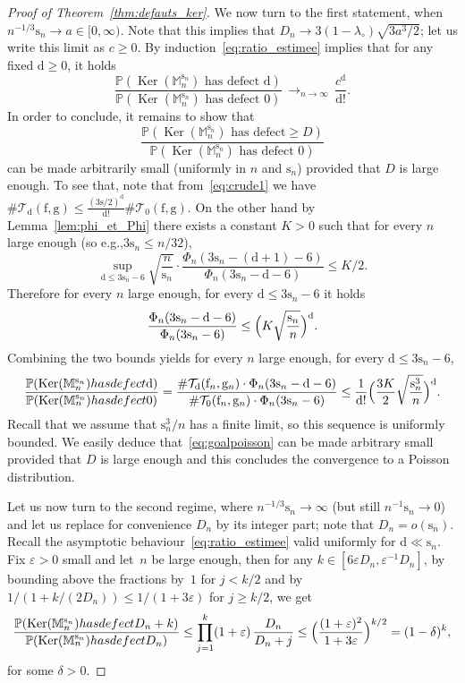 \documentclass[11pt]{article}
\newcommand{\eg}{e.g.,\xspace}
\theoremstyle{plain}
\theoremstyle{definition}
\theoremstyle{remark}
\renewcommand{\P}{\mathbb{P}}
\newcommand{\Mapb}{\mathbb{M}}
\newcommand{\face}{\mathrm{f}}
\newcommand{\defect}{\mathrm{d}}
\newcommand{\gen}{\mathrm{g}}
\newcommand{\spar}{\mathrm{s}}
\DeclareMathOperator{\Ker}{Ker}
\newcommand{\cv}[1][n]{\,\mathop{\longrightarrow}^{}_{#1 \to \infty}\,}
\begin{document}
\begin{proof}[Proof of Theorem~\ref{thm:defauts_ker}]
We now turn to the first statement, when $n^{-1/3} \spar_n \to a \in [0,\infty)$. Note that this implies that $D_n \to 3 (1-\lambda_{\circ}) \sqrt{3 a^3 / 2}$; let us write this limit as $c \ge 0$.
By induction~\eqref{eq:ratio_estimee} implies that for any fixed $\defect\ge0$, it holds
\[
\frac{\P(\Ker(\Mapb_n^{\spar_n}) \textrm{ has defect } \defect)}{\P(\Ker(\Mapb_n^{\spar_n}) \textrm{ has defect } 0)}
\cv \frac{c^\defect}{\defect!}.
\]
In order to conclude, it remains to show that
\begin{equation}\label{eq:goalpoisson}
\frac{\P(\Ker(\Mapb_n^{\spar_n}) \textrm{ has defect} \geq D)}{\P(\Ker(\Mapb_n^{\spar_n}) \textrm{ has defect } 0)}
\end{equation}
can be made arbitrarily small (uniformly in $n$ and $\mathrm{s}_{n}$) provided that $D$ is large enough. To see that, note that from~\eqref{eq:crude1} we have $\# \mathcal{T}_{\defect}(\face,\gen) \le \frac{(3\spar/2)^\defect}{\defect!} \# \mathcal{T}_{0}(\face,\gen)$.
On the other hand by Lemma~\ref{lem:phi_et_Phi} there exists a constant $K>0$ such that for every $n$ large enough (so \eg $3\spar_n \le n/32$),
\[
\sup_{\defect \le 3\spar_n-6} \sqrt{\frac{n}{\spar_n}} \cdot \frac{\Phi_{n}(3\spar_n-(\defect+1)-6 )}{\Phi_{n}(3\spar_n-\defect-6 )}
\le K/2.
\]
Therefore for every $n$ large enough, for every $\defect \le 3\spar_n-6$ it holds
\[
\frac{\Phi_{n}(3\spar_n-\defect-6 )}{\Phi_{n}(3\spar_n-6 )} \le \Bigl(K \sqrt{\frac{\spar_n}{n}}\Bigr)^\defect.
\]
Combining the two bounds yields for every $n$ large enough, for every $\defect \le 3\spar_n-6$,
\[
\frac{\P(\Ker(\Mapb_n^{\spar_n}) \textrm{ has defect } \defect)}{\P(\Ker(\Mapb_n^{\spar_n}) \textrm{ has defect } 0)}
= \frac{\#\mathcal{T}_\defect(\face_n,\gen_n) \cdot \Phi_{n}(3\spar_n-\defect-6)}{\# \mathcal{T}_0(\face_n,\gen_n) \cdot \Phi_{n}(3\spar_n-6 )}
\le \frac{1}{\defect!} \Bigl(\frac{3K}{2} \sqrt{\frac{\spar_n^3}{n}}\Bigr)^\defect.
\]
Recall that we assume that $\spar_n^3/n$ has a finite limit, so this sequence is uniformly bounded. We easily deduce that~\eqref{eq:goalpoisson} can be made arbitrary small provided that $D$ is large enough and this concludes the convergence to a Poisson distribution.

Let us now turn to the second regime, where $n^{-1/3} \spar_n \to \infty$ (but still $n^{-1} \spar_n \to 0$) and let us replace for convenience $D_n$ by its integer part; note that $D_n = o(\spar_n)$.
Recall the asymptotic behaviour~\eqref{eq:ratio_estimee} valid uniformly for $\defect \ll \spar_n$.
Fix $\varepsilon > 0$ small and let~$n$ be large enough, then for any $k \in [6\varepsilon D_n, \varepsilon^{-1} D_n]$, by bounding above the fractions by~$1$ for $j<k/2$ and by $1/(1+k/(2D_n)) \le 1/(1+3\varepsilon)$ for $j \ge k/2$, we get
\[
\frac{\P(\Ker(\Mapb_n^{\spar_n}) \textrm{ has defect } D_n+k)}{\P(\Ker(\Mapb_n^{\spar_n}) \textrm{ has defect } D_n)}
\le \prod_{j=1}^k (1+\varepsilon)\, \frac{D_n}{D_n+j}
\le \Bigl(\frac{(1+\varepsilon)^2}{1+3\varepsilon}\Bigr)^{k/2}
= (1-\delta)^{k},
\]
for some $\delta >0$.


\end{proof}
\end{document}
